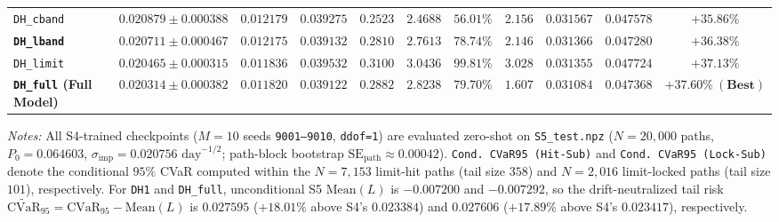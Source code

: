 \documentclass[11pt,a4paper]{article}
\begin{document}
\begin{table}[htbp]
{\begin{tabular}{lcccccccccc}
    \texttt{DH\_cband} & $0.020879 \pm 0.000388$ & $0.012179$ & $0.039275$ & $\mathbf{0.2523}$ & $\mathbf{2.4688}$ & $\mathbf{56.01\%}$ & $2.156$ & $0.031567$ & $0.047578$ & $+35.86\%$ \\
    \textbf{\texttt{DH\_lband}} & $0.020711 \pm 0.000467$ & $0.012175$ & $0.039132$ & $\mathbf{0.2810}$ & $\mathbf{2.7613}$ & $\mathbf{78.74\%}$ & $2.146$ & $0.031366$ & $\mathbf{0.047280}$ & $+36.38\%$ \\
    \texttt{DH\_limit} & $0.020465 \pm 0.000315$ & $0.011836$ & $0.039532$ & $0.3100$ & $3.0436$ & $99.81\%$ & $3.028$ & $0.031355$ & $0.047724$ & $+37.13\%$ \\
    \textbf{\texttt{DH\_full} (Full Model)} & $\mathbf{0.020314 \pm 0.000382}$ & $\mathbf{0.011820}$ & $0.039122$ & $0.2882$ & $2.8238$ & $\mathbf{79.70\%}$ & $\mathbf{1.607}$ & $0.031084$ & $0.047368$ & $\mathbf{+37.60\%\ (\text{Best})}$ \\
    \bottomrule
  \end{tabular}%
  }
  \vspace{3pt}\par\noindent
  \begin{minipage}{\textwidth}
    \footnotesize
    \textit{Notes:} All S4-trained checkpoints ($M = 10$ seeds \texttt{9001--9010}, \texttt{ddof=1}) are evaluated zero-shot on \texttt{S5\_test.npz} ($N = 20,000$ paths, $P_0 = 0.064603$, $\sigma_{\text{imp}} = 0.020756\text{ day}^{-1/2}$; path-block bootstrap $\text{SE}_{\text{path}} \approx 0.00042$). \texttt{Cond.\ CVaR95 (Hit-Sub)} and \texttt{Cond.\ CVaR95 (Lock-Sub)} denote the conditional $95\%$ CVaR computed within the $N = 7,153$ limit-hit paths (tail size $358$) and $N = 2,016$ limit-locked paths (tail size $101$), respectively. For \texttt{DH1} and \texttt{DH\_full}, unconditional S5 $\text{Mean}(L)$ is $-0.007200$ and $-0.007292$, so the drift-neutralized tail risk $\widetilde{\text{CVaR}}_{95} = \text{CVaR}_{95} - \text{Mean}(L)$ is $0.027595$ ($+18.01\%$ above S4's $0.023384$) and $0.027606$ ($+17.89\%$ above S4's $0.023417$), respectively.
  \end{minipage}
\end{table}
\end{document}
